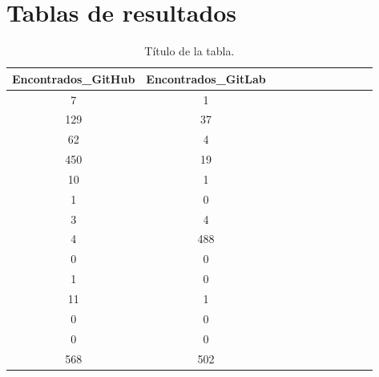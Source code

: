 \section{Tablas de resultados}

\begin{table}
  \centering
  \caption{Título de la tabla.}
  \label{tab:una_tabla}

\begin{footnotesize}
\renewcommand{\arraystretch}{1.5} %
\begin{tabular}{ccccccccccc}
  \hline
    Encontrados\_GitHub &  Encontrados\_GitLab \\ 
  \hline
                    7 &                    1 \\
                    129 &                  37 \\
                    62 &                   4 \\
                    450 &                  19 \\
                    10 &                   1 \\
                    1 &                    0 \\
                    3 &                    4 \\
                    4 &                    488 \\
                    0 &                    0 \\
                    1 &                    0 \\
                    11 &                   1 \\
                    0 &                    0 \\
                    0 &                    0 \\
                    568 &                  502 \\
 \end{tabular}
\end{footnotesize}

\end{table}